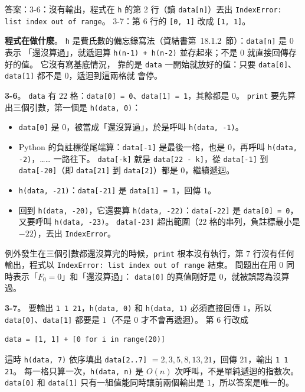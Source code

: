 \begin{pastsoln}
答案：3-6：沒有輸出，程式在 \texttt{h} 的第 2 行（讀 \texttt{data[n]}）丟出 \texttt{IndexError: list index out of range}。 3-7：第 6 行的
\texttt{[0, 1]} 改成 \texttt{[1, 1]}。

\textbf{程式在做什麼}。 \texttt{h} 是費氏數的備忘錄寫法（資結書第~18.1.2~節）：\texttt{data[n]} 是 $0$ 表示
「還沒算過」，就遞迴算 \texttt{h(n-1) + h(n-2)} 並存起來；不是 $0$ 就直接回傳存好的值。 它沒有寫基底情況，
靠的是 \texttt{data} 一開始就放好的值：只要 \texttt{data[0]}、\texttt{data[1]} 都不是 $0$，遞迴到這兩格就
會停。

\textbf{3-6}。 \texttt{data} 有 $22$ 格：\texttt{data[0] = 0}、\texttt{data[1] = 1}，其餘都是 $0$。
\texttt{print} 要先算出三個引數，第一個是 \texttt{h(data, 0)}：
\begin{itemize}
\item \texttt{data[0]} 是 $0$，被當成「還沒算過」，於是呼叫 \texttt{h(data, -1)}。
\item Python 的負註標從尾端算：\texttt{data[-1]} 是最後一格，也是 $0$，再呼叫 \texttt{h(data, -2)}，……
一路往下。 \texttt{data[-k]} 就是 \texttt{data[22 - k]}，從 \texttt{data[-1]} 到 \texttt{data[-20]}（即
\texttt{data[21]} 到 \texttt{data[2]}）都是 $0$，繼續遞迴。
\item \texttt{h(data, -21)}：\texttt{data[-21]} 是 \texttt{data[1] = 1}，回傳 $1$。
\item 回到 \texttt{h(data, -20)}，它還要算 \texttt{h(data, -22)}：\texttt{data[-22]} 是 \texttt{data[0] = 0}，
又要呼叫 \texttt{h(data, -23)}。 \texttt{data[-23]} 超出範圍（$22$ 格的串列，負註標最小是 $-22$），丟出
\texttt{IndexError}。
\end{itemize}
例外發生在三個引數都還沒算完的時候，\texttt{print} 根本沒有執行，第 7 行沒有任何輸出，程式以
\texttt{IndexError: list index out of range} 結束。 問題出在用 $0$ 同時表示「$F_0 = 0$」和「還沒算過」：
\texttt{data[0]} 的真值剛好是 $0$，就被誤認為沒算過。

\textbf{3-7}。 要輸出 \texttt{1 1 21}，\texttt{h(data, 0)} 和 \texttt{h(data, 1)} 必須直接回傳 $1$，所以
\texttt{data[0]}、\texttt{data[1]} 都要是 $1$（不是 $0$ 才不會再遞迴）。 第 6 行改成
\begin{verbatim}
data = [1, 1] + [0 for i in range(20)]
\end{verbatim}
這時 \texttt{h(data, 7)} 依序填出 \texttt{data[2..7]} $= 2, 3, 5, 8, 13, 21$，回傳 $21$，輸出
\texttt{1 1 21}。 每一格只算一次，\texttt{h(data, n)} 是 $O(n)$ 次呼叫，不是單純遞迴的指數次。 \texttt{data[0]}
和 \texttt{data[1]} 只有一組值能同時讓前兩個輸出是 $1$，所以答案是唯一的。
\end{pastsoln}
